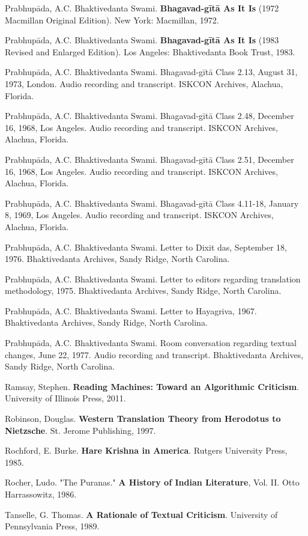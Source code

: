 \documentclass[12pt,twoside]{book}
\begin{document}
Prabhupāda, A.C. Bhaktivedanta Swami. \textbf{Bhagavad-gītā As It Is} (1972 Macmillan Original Edition). New York: Macmillan, 1972.

Prabhupāda, A.C. Bhaktivedanta Swami. \textbf{Bhagavad-gītā As It Is} (1983 Revised and Enlarged Edition). Los Angeles: Bhaktivedanta Book Trust, 1983.

Prabhupāda, A.C. Bhaktivedanta Swami. Bhagavad-gītā Class 2.13, August 31, 1973, London. Audio recording and transcript. ISKCON Archives, Alachua, Florida.

Prabhupāda, A.C. Bhaktivedanta Swami. Bhagavad-gītā Class 2.48, December 16, 1968, Los Angeles. Audio recording and transcript. ISKCON Archives, Alachua, Florida.

Prabhupāda, A.C. Bhaktivedanta Swami. Bhagavad-gītā Class 2.51, December 16, 1968, Los Angeles. Audio recording and transcript. ISKCON Archives, Alachua, Florida.

Prabhupāda, A.C. Bhaktivedanta Swami. Bhagavad-gītā Class 4.11-18, January 8, 1969, Los Angeles. Audio recording and transcript. ISKCON Archives, Alachua, Florida.

Prabhupāda, A.C. Bhaktivedanta Swami. Letter to Dixit das, September 18, 1976. Bhaktivedanta Archives, Sandy Ridge, North Carolina.

Prabhupāda, A.C. Bhaktivedanta Swami. Letter to editors regarding translation methodology, 1975. Bhaktivedanta Archives, Sandy Ridge, North Carolina.

Prabhupāda, A.C. Bhaktivedanta Swami. Letter to Hayagriva, 1967. Bhaktivedanta Archives, Sandy Ridge, North Carolina.

Prabhupāda, A.C. Bhaktivedanta Swami. Room conversation regarding textual changes, June 22, 1977. Audio recording and transcript. Bhaktivedanta Archives, Sandy Ridge, North Carolina.

Ramsay, Stephen. \textbf{Reading Machines: Toward an Algorithmic Criticism}. University of Illinois Press, 2011.

Robinson, Douglas. \textbf{Western Translation Theory from Herodotus to Nietzsche}. St. Jerome Publishing, 1997.

Rochford, E. Burke. \textbf{Hare Krishna in America}. Rutgers University Press, 1985.

Rocher, Ludo. "The Puranas." \textbf{A History of Indian Literature}, Vol. II. Otto Harrassowitz, 1986.

Tanselle, G. Thomas. \textbf{A Rationale of Textual Criticism}. University of Pennsylvania Press, 1989.
\end{document}
